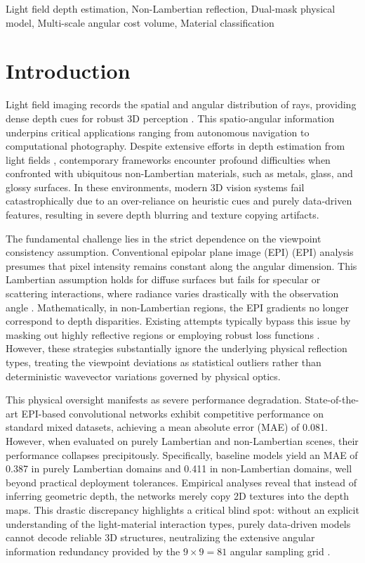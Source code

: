 \documentclass[lettersize,journal]{IEEEtran}
\begin{document}
\begin{IEEEkeywords}
Light field depth estimation, Non-Lambertian reflection, Dual-mask physical model, Multi-scale angular cost volume, Material classification
\end{IEEEkeywords}

\section{Introduction}

Light field imaging records the spatial and angular distribution of rays, providing dense depth cues for robust 3D perception \cite{ng2005, ng2006}. This spatio-angular information underpins critical applications ranging from autonomous navigation to computational photography. Despite extensive efforts in depth estimation from light fields \cite{honauer2016, wanner2014, tao2013}, contemporary frameworks encounter profound difficulties when confronted with ubiquitous non-Lambertian materials, such as metals, glass, and glossy surfaces. In these environments, modern 3D vision systems fail catastrophically due to an over-reliance on heuristic cues and purely data-driven features, resulting in severe depth blurring and texture copying artifacts.

The fundamental challenge lies in the strict dependence on the viewpoint consistency assumption. Conventional epipolar plane image (EPI) (EPI) analysis \cite{heber2018, wang2015} presumes that pixel intensity remains constant along the angular dimension. This Lambertian assumption holds for diffuse surfaces but fails for specular or scattering interactions, where radiance varies drastically with the observation angle \cite{blinn1977}. Mathematically, in non-Lambertian regions, the EPI gradients no longer correspond to depth disparities. Existing attempts typically bypass this issue by masking out highly reflective regions or employing robust loss functions \cite{li2021, zhang2023}. However, these strategies substantially ignore the underlying physical reflection types, treating the viewpoint deviations as statistical outliers rather than deterministic wavevector variations governed by physical optics.

This physical oversight manifests as severe performance degradation. State-of-the-art EPI-based convolutional networks \cite{heber2018} exhibit competitive performance on standard mixed datasets, achieving a mean absolute error (MAE) of 0.081. However, when evaluated on purely Lambertian and non-Lambertian scenes, their performance collapses precipitously. Specifically, baseline models yield an MAE of 0.387 in purely Lambertian domains and 0.411 in non-Lambertian domains, well beyond practical deployment tolerances. Empirical analyses reveal that instead of inferring geometric depth, the networks merely copy 2D textures into the depth maps. This drastic discrepancy highlights a critical blind spot: without an explicit understanding of the light-material interaction types, purely data-driven models cannot decode reliable 3D structures, neutralizing the extensive angular information redundancy provided by the $9 \times 9 = 81$ angular sampling grid \cite{levin2011}.
\end{document}

